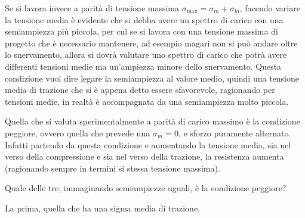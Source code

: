 \documentclass{article}
\begin{document}
\begin{adjustwidth}{2in}{}
			 Se si lavora invece a parità di tensione massima $\sigma_{\max} = \sigma_m + \sigma_{la}$, facendo variare la tensione media è evidente che si debba avere un spettro di carico con una semiampiezza più piccola, per cui se si lavora con una tensione massima di progetto che è necessario mantenere, ad esempio magari non si può andare oltre lo snervamento, allora si dovrà valutare uno spettro di carico che potrà avere differenti tensioni medie ma un'ampiezza minore dello snervamento. Questa condizione vuol dire legare la semiampiezza al valore medio, quindi una tensione media di trazione che si è appena detto essere sfavorevole, ragionando per tensioni medie, in realtà è accompagnata da una semiampiezza molto piccola. \newline
			 
			 Quella che si valuta sperimentalmente a parità di carico massimo è la condizione peggiore, ovvero quella che prevede una $\sigma_m=0$, e sforzo puramente alternato. Infatti partendo da questa condizione e aumentando
			 la tensione media, sia nel verso della compressione e sia nel verso della trazione, la resistenza aumenta
			 (ragionando sempre in termini si stessa tensione massima).
			 
			 Quale delle tre, immaginando semiampiezze uguali, è la condizione peggiore?
			 
			 \begin{figure}[H]
			 	\centering
			 \end{figure}
			 
			 La prima, quella che ha una sigma media di trazione. \newline
			 

\end{adjustwidth}
\end{document}
